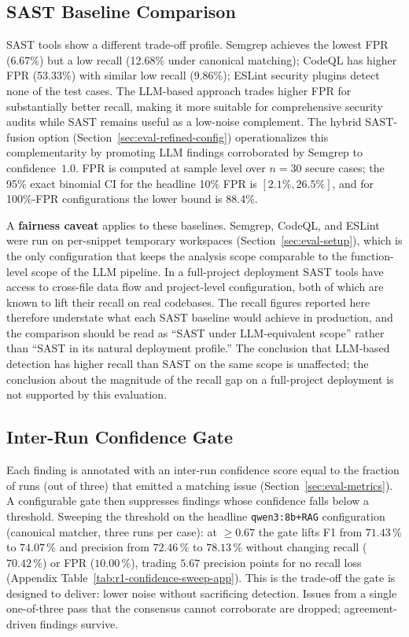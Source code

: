\subsection{SAST Baseline Comparison}

SAST tools show a different trade-off profile. Semgrep achieves the lowest FPR (6.67\%) but a low recall (12.68\% under canonical matching); CodeQL has higher FPR (53.33\%) with similar low recall (9.86\%); ESLint security plugins detect none of the test cases. The LLM-based approach trades higher FPR for substantially better recall, making it more suitable for comprehensive security audits while SAST remains useful as a low-noise complement. The hybrid SAST-fusion option (Section~\ref{sec:eval-refined-config}) operationalizes this complementarity by promoting LLM findings corroborated by Semgrep to confidence~$1.0$. FPR is computed at sample level over $n=30$ secure cases; the 95\% exact binomial CI for the headline 10\% FPR is $[2.1\%, 26.5\%]$, and for 100\%-FPR configurations the lower bound is 88.4\%.

A \textbf{fairness caveat} applies to these baselines. Semgrep, CodeQL, and ESLint were run on per-snippet temporary workspaces (Section~\ref{sec:eval-setup}), which is the only configuration that keeps the analysis scope comparable to the function-level scope of the LLM pipeline. In a full-project deployment SAST tools have access to cross-file data flow and project-level configuration, both of which are known to lift their recall on real codebases. The recall figures reported here therefore understate what each SAST baseline would achieve in production, and the comparison should be read as ``SAST under LLM-equivalent scope'' rather than ``SAST in its natural deployment profile.'' The conclusion that LLM-based detection has higher recall than SAST on the same scope is unaffected; the conclusion about the magnitude of the recall gap on a full-project deployment is not supported by this evaluation.

\subsection{Inter-Run Confidence Gate}
\label{sec:eval-r1-confidence}

Each finding is annotated with an inter-run confidence score equal to the fraction of runs (out of three) that emitted a matching issue (Section~\ref{sec:eval-metrics}). A configurable gate then suppresses findings whose confidence falls below a threshold. Sweeping the threshold on the headline \texttt{qwen3:8b+RAG} configuration (canonical matcher, three runs per case): at $\geq 0.67$ the gate lifts F1 from $71.43\,\%$ to $\mathbf{74.07\,\%}$ and precision from $72.46\,\%$ to $\mathbf{78.13\,\%}$ without changing recall ($70.42\,\%$) or FPR ($10.00\,\%$), trading $5.67$ precision points for no recall loss (Appendix Table~\ref{tab:r1-confidence-sweep-app}). This is the trade-off the gate is designed to deliver: lower noise without sacrificing detection. Issues from a single one-of-three pass that the consensus cannot corroborate are dropped; agreement-driven findings survive.

